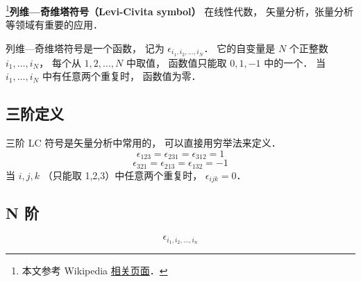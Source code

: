
\footnote{本文参考 Wikipedia \href{https://en.wikipedia.org/wiki/Levi-Civita_symbol}{相关页面}．}\textbf{列维—奇维塔符号（Levi-Civita symbol）} 在线性代数， 矢量分析，张量分析等领域有重要的应用．

列维—奇维塔符号是一个函数， 记为 $\epsilon_{i_1, i_2, \dots, i_N}$． 它的自变量是 $N$ 个正整数 $i_1, \dots, i_N$， 每个从 $1, 2, \dots, N$ 中取值， 函数值只能取 $0, 1, -1$ 中的一个． 当 $i_1, \dots, i_N$ 中有任意两个重复时， 函数值为零．

\subsection{三阶定义}
三阶 LC 符号是矢量分析中常用的， 可以直接用穷举法来定义．
\begin{equation}
\epsilon_{123} = \epsilon_{231} = \epsilon_{312} = 1
\end{equation}
\begin{equation}
\epsilon_{321} = \epsilon_{213} = \epsilon_{132} = -1
\end{equation}
当 $i,j,k$ （只能取 1,2,3）中任意两个重复时， $\epsilon_{ijk} = 0$．

\subsection{N 阶}
\begin{equation}
\epsilon_{i_1,i_2,\dots, i_n}
\end{equation}
